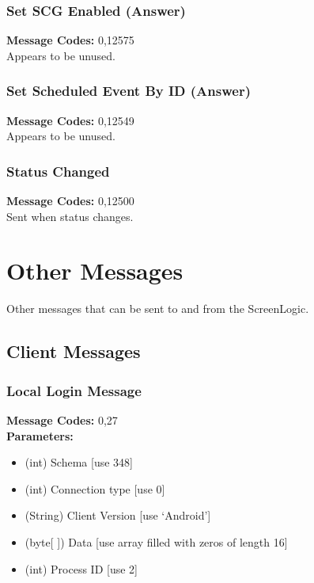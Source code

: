\documentclass[11pt]{article}
\begin{document}
\subsubsection{Set SCG Enabled (Answer)}
\label{msg:12575}
{\bf Message Codes: } 0,12575\\
Appears to be unused.

\subsubsection{Set Scheduled Event By ID (Answer)}
\label{msg:12549}
{\bf Message Codes: } 0,12549\\
Appears to be unused.

\subsubsection{Status Changed}
\label{msg:12500}
{\bf Message Codes: } 0,12500\\
Sent when status changes.

\clearpage
\section{Other Messages}
\label{sec:other_mess}
Other messages that can be sent to and from the ScreenLogic.

\subsection{Client Messages}

\subsubsection{Local Login Message}
\label{msg:27}
{\bf Message Codes: } 0,27\\
{\bf Parameters: }
\small
\begin{itemize}
\item (int) Schema [use 348]
\item (int) Connection type [use 0]
\item (String) Client Version [use `Android']
\item (byte[ ]) Data [use array filled with zeros of length 16]
\item (int) Process ID [use 2]
\end{itemize}
\normalsize
\end{document}
